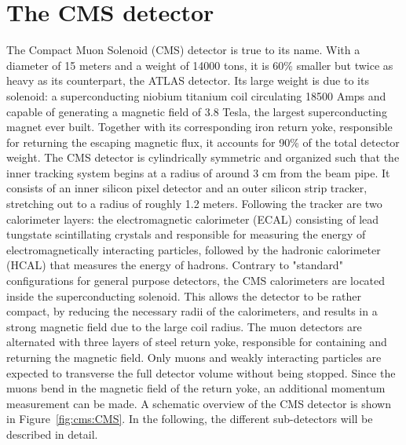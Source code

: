 \chapter{The CMS detector}
The Compact Muon Solenoid (CMS) detector is true to its name. With a diameter of 15 meters and a weight of 14000 tons, it is 60\% smaller but twice as heavy as its counterpart, the ATLAS detector.
Its large weight is due to its solenoid: a superconducting niobium titanium coil circulating 18500 Amps and capable of generating a magnetic field of 3.8 Tesla, the largest superconducting magnet ever built. Together with its corresponding iron return yoke, responsible for returning the escaping magnetic flux, it accounts for 90\% of the total detector weight.
The CMS detector is cylindrically symmetric and organized such that the inner tracking system begins at a radius of around 3 cm from the beam pipe. It consists of an inner silicon pixel detector and an outer silicon strip tracker, stretching out to a radius of roughly 1.2 meters. Following the tracker are two calorimeter layers: the electromagnetic calorimeter (ECAL) consisting of lead tungstate scintillating crystals and responsible for measuring the energy of electromagnetically interacting particles, followed by the hadronic calorimeter (HCAL) that measures the energy of hadrons.
Contrary to "standard" configurations for general purpose detectors, the CMS calorimeters are located inside the superconducting solenoid. This allows the detector to be rather compact, by reducing the necessary radii of the calorimeters, and results in a strong magnetic field due to the large coil radius. The muon detectors are alternated with three layers of steel return yoke, responsible for containing and returning the magnetic field. Only muons and weakly interacting particles are expected to transverse the full detector volume without being stopped. Since the muons bend in the magnetic field of the return yoke, an additional momentum measurement can be made. A schematic overview of the CMS detector is shown in Figure~\ref{fig:cms:CMS}. In the following, the different sub-detectors will be described in detail.
